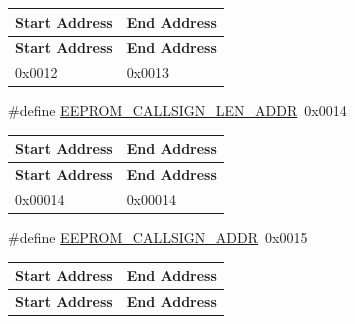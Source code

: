 \begin{DoxyCompactItemize}
\begin{DoxyCompactList}
\begin{longtabu} spread 0pt [c]{*{2}{|X[-1]}|}
\hline
\rowcolor{\tableheadbgcolor}\textbf{ Start Address}&\textbf{ End Address  }\\
\endfirsthead
\hline
\endfoot
\hline
\rowcolor{\tableheadbgcolor}\textbf{ Start Address}&\textbf{ End Address  }\\
\endhead
0x0012&0x0013 \\
\end{longtabu}
\end{DoxyCompactList}\item 
\mbox{\label{group__defines__eeprom__address__map_ga84c346e7353930c5977017a1efa4ff55}} 
\#define \hyperlink{group__defines__eeprom__address__map_ga84c346e7353930c5977017a1efa4ff55}{E\+E\+P\+R\+O\+M\+\_\+\+C\+A\+L\+L\+S\+I\+G\+N\+\_\+\+L\+E\+N\+\_\+\+A\+D\+DR}~0x0014
\begin{DoxyCompactList}\small\item\em \tabulinesep=1mm
\begin{longtabu} spread 0pt [c]{*{2}{|X[-1]}|}
\hline
\rowcolor{\tableheadbgcolor}\textbf{ Start Address}&\textbf{ End Address  }\\
\endfirsthead
\hline
\endfoot
\hline
\rowcolor{\tableheadbgcolor}\textbf{ Start Address}&\textbf{ End Address  }\\
\endhead
0x00014&0x00014 \\
\end{longtabu}
\end{DoxyCompactList}\item 
\mbox{\label{group__defines__eeprom__address__map_ga914e5eca76c425eef3794078a440ef89}} 
\#define \hyperlink{group__defines__eeprom__address__map_ga914e5eca76c425eef3794078a440ef89}{E\+E\+P\+R\+O\+M\+\_\+\+C\+A\+L\+L\+S\+I\+G\+N\+\_\+\+A\+D\+DR}~0x0015
\begin{DoxyCompactList}\small\item\em \tabulinesep=1mm
\begin{longtabu} spread 0pt [c]{*{2}{|X[-1]}|}
\hline
\rowcolor{\tableheadbgcolor}\textbf{ Start Address}&\textbf{ End Address  }\\
\endfirsthead
\hline
\endfoot
\hline
\rowcolor{\tableheadbgcolor}\textbf{ Start Address}&\textbf{ End Address  }\\

\end{longtabu}
\end{DoxyCompactList}
\end{DoxyCompactItemize}

